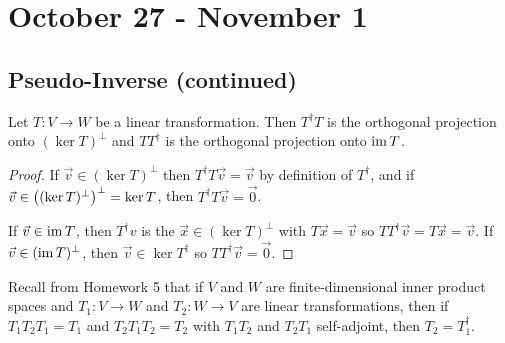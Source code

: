 \chapter{October 27 - November 1}

\section{Pseudo-Inverse (continued)}

\begin{theorem}
  Let $T : V \to W$ be a linear transformation. Then $T^\dagger T$ is the orthogonal projection onto $(\ker T)^\perp$ and
  $T T^\dagger$ is the orthogonal projection onto $\operatorname{im} T$.
\end{theorem}
\begin{proof}
  If $\vec v \in (\ker T)^\perp$ then $T^\dagger T\vec v = \vec v$ by definition of $T^\dagger$,
  and if $\vec v \in \left((\ker T)^\perp\right)^\perp = \ker T$, then $T^\dagger T \vec v = \vec 0$.

  If $\vec v \in \operatorname{im} T$, then $T^\dagger v$ is the $\vec x \in (\ker T)^\perp$ with $T\vec x = \vec v$ so $TT^\dagger\vec v = T\vec x = \vec v$.
  If $\vec v \in (\operatorname{im} T)^\perp$, then $\vec v \in \ker T^\dagger$ so $TT^\dagger \vec v = \vec 0$.
\end{proof}

\begin{remark}
  Recall from Homework 5 that if $V$ and $W$ are finite-dimensional inner product spaces and $T_1 : V \to W$
  and $T_2 : W \to V$ are linear transformations, then if $T_1T_2T_1 = T_1$ and $T_2T_1T_2 = T_2$
  with $T_1T_2$ and $T_2T_1$ self-adjoint, then $T_2 = T_1^\dagger$.
\end{remark}

